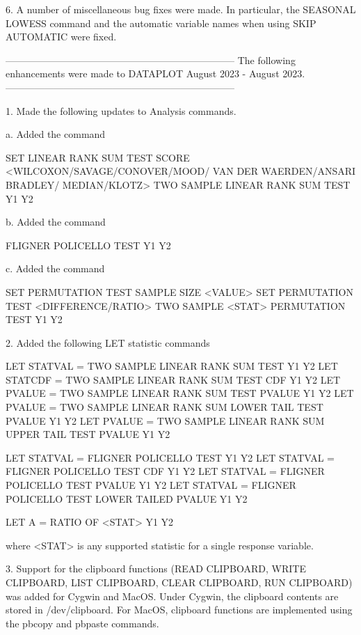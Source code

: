  6. A number of miscellaneous bug fixes were made.  In particular,
    the SEASONAL LOWESS command and the automatic variable names when
    using SKIP AUTOMATIC were fixed.

-----------------------------------------------------------------------
The following enhancements were made to DATAPLOT
August 2023 - August 2023.
-----------------------------------------------------------------------

 1. Made the following updates to Analysis commands.

    a. Added the command

         SET LINEAR RANK SUM TEST SCORE <WILCOXON/SAVAGE/CONOVER/MOOD/
                                         VAN DER WAERDEN/ANSARI BRADLEY/
                                         MEDIAN/KLOTZ>
         TWO SAMPLE LINEAR RANK SUM TEST Y1 Y2

    b. Added the command

         FLIGNER POLICELLO TEST Y1 Y2

    c. Added the command

         SET PERMUTATION TEST SAMPLE SIZE <VALUE>
         SET PERMUTATION TEST <DIFFERENCE/RATIO>
         TWO SAMPLE <STAT> PERMUTATION TEST Y1 Y2

 2. Added the following LET statistic commands

        LET STATVAL = TWO SAMPLE LINEAR RANK SUM TEST                   Y1 Y2
        LET STATCDF = TWO SAMPLE LINEAR RANK SUM TEST CDF               Y1 Y2
        LET PVALUE  = TWO SAMPLE LINEAR RANK SUM TEST PVALUE            Y1 Y2
        LET PVALUE  = TWO SAMPLE LINEAR RANK SUM LOWER TAIL TEST PVALUE Y1 Y2
        LET PVALUE  = TWO SAMPLE LINEAR RANK SUM UPPER TAIL TEST PVALUE Y1 Y2

        LET STATVAL = FLIGNER POLICELLO TEST                     Y1 Y2
        LET STATVAL = FLIGNER POLICELLO TEST CDF                 Y1 Y2
        LET STATVAL = FLIGNER POLICELLO TEST PVALUE              Y1 Y2
        LET STATVAL = FLIGNER POLICELLO TEST LOWER TAILED PVALUE Y1 Y2

        LET A = RATIO OF <STAT>  Y1 Y2

        where <STAT> is any supported statistic for a single response
        variable.

 3. Support for the clipboard functions (READ CLIPBOARD, WRITE CLIPBOARD,
    LIST CLIPBOARD, CLEAR CLIPBOARD, RUN CLIPBOARD) was added for
    Cygwin and MacOS.  Under Cygwin, the clipboard contents are stored
    in /dev/clipboard.   For MacOS, clipboard functions are implemented
    using the pbcopy and pbpaste commands.

